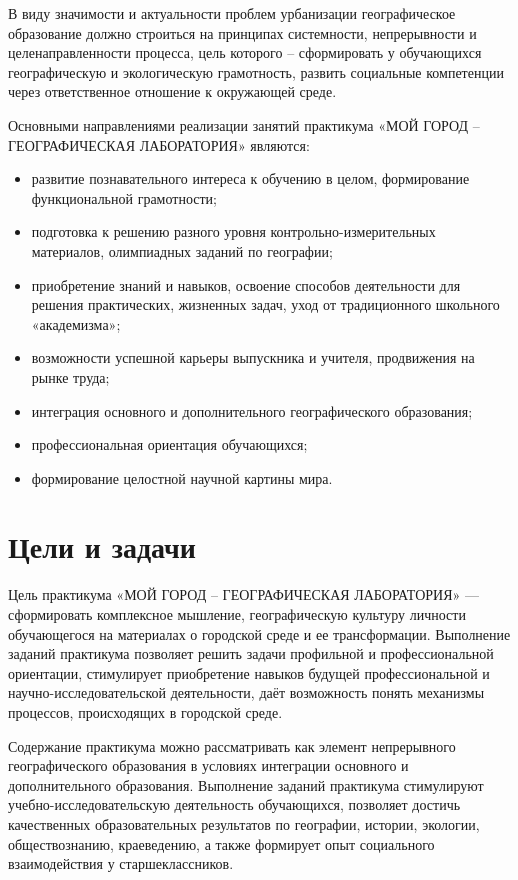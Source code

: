 \documentclass[
  11pt,
  russian,
]{book}
\begin{document}
В виду значимости и актуальности проблем урбанизации географическое образование должно строиться на принципах системности, непрерывности и целенаправленности процесса, цель которого -- сформировать у обучающихся географическую и экологическую грамотность, развить социальные компетенции через ответственное отношение к окружающей среде.

Основными направлениями реализации занятий практикума «МОЙ ГОРОД -- ГЕОГРАФИЧЕСКАЯ ЛАБОРАТОРИЯ» являются:

\begin{itemize}
\item
  развитие познавательного интереса к обучению в целом, формирование функциональной грамотности;
\item
  подготовка к решению разного уровня контрольно-измерительных материалов, олимпиадных заданий по географии;
\item
  приобретение знаний и навыков, освоение способов деятельности для решения практических, жизненных задач, уход от традиционного школьного «академизма»;
\item
  возможности успешной карьеры выпускника и учителя, продвижения на рынке труда;
\item
  интеграция основного и дополнительного географического образования;
\item
  профессиональная ориентация обучающихся;
\item
  формирование целостной научной картины мира.
\end{itemize}

\hypertarget{ux446ux435ux43bux438-ux438-ux437ux430ux434ux430ux447ux438}{%
\section*{Цели и задачи}\label{ux446ux435ux43bux438-ux438-ux437ux430ux434ux430ux447ux438}}

Цель практикума «МОЙ ГОРОД -- ГЕОГРАФИЧЕСКАЯ ЛАБОРАТОРИЯ» --- сформировать комплексное мышление, географическую культуру личности обучающегося на материалах о городской среде и ее трансформации. Выполнение заданий практикума позволяет решить задачи профильной и профессиональной ориентации, стимулирует приобретение навыков будущей профессиональной и научно-исследовательской деятельности, даёт возможность понять механизмы процессов, происходящих в городской среде.

Содержание практикума можно рассматривать как элемент непрерывного географического образования в условиях интеграции основного и дополнительного образования. Выполнение заданий практикума стимулируют учебно-исследовательскую деятельность обучающихся, позволяет достичь качественных образовательных результатов по географии, истории, экологии, обществознанию, краеведению, а также формирует опыт социального взаимодействия у старшеклассников.
\end{document}
